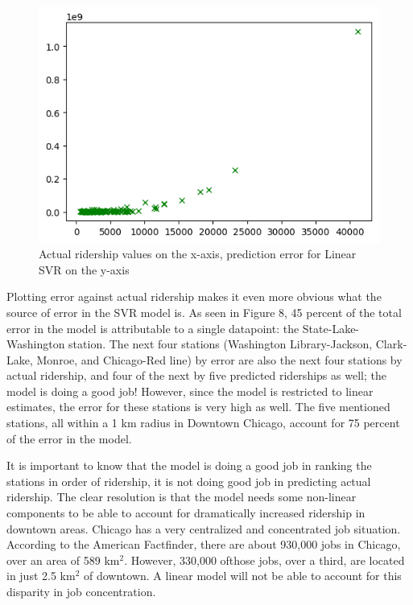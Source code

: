 \documentclass{article}
\begin{document}
\begin{figure}[H]\label{fig:f8}
\begin{center}\includegraphics[scale=1]{actual_vs_error_chi}\end{center}
\caption{Actual ridership values on the x-axis, prediction error for Linear SVR on the y-axis}
\end{figure}

Plotting error against actual ridership makes it even more obvious what the source of error in the SVR model is. As seen in Figure 8, 45 percent of the total error in the model is attributable to a single datapoint: the State-Lake-Washington station. The next four stations (Washington Library-Jackson, Clark-Lake, Monroe, and Chicago-Red line) by error are also the next four stations by actual ridership, and four of the next by five predicted riderships as well; the model is doing a good job! However, since the model is restricted to linear estimates, the error for these stations is very high as well. The five mentioned stations, all within a 1 km radius in Downtown Chicago, account for 75 percent of the error in the model.

It is important to know that the model is doing a good job in ranking the stations in order of ridership, it is not doing good job in predicting actual ridership. The clear resolution is that the model needs some non-linear components to be able to account for dramatically increased ridership in downtown areas. Chicago has a very centralized and concentrated job situation. According to the American Factfinder, there are about 930,000 jobs in Chicago, over an area of 589 km$^2$. However, 330,000 ofthose jobs, over a third, are located in just 2.5 km$^2$ of downtown. A linear model will not be able to account for this disparity in job concentration. 
\end{document}
